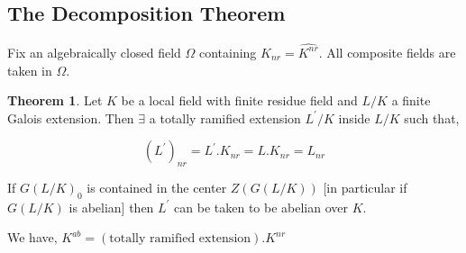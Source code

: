 \documentclass{article}
\theoremstyle{definition}
\newtheorem{theorem}{Theorem}
\numberwithin{theorem}{subsection}
\begin{document}
    \subsection*{The Decomposition Theorem}

    Fix an algebraically closed field \(\Omega\) containing \(K_{nr} = \widehat{K^{nr}}\). All composite fields are taken in \(\Omega\).

    \begin{theorem}
        Let \(K\) be a local field with finite residue field and \(L / K\) a finite Galois extension. Then \(\exists\) a totally ramified extension \(L^{\prime} / K\) inside \(L / K\) such that,

        \[
            (L^{\prime})_{nr} = L^{\prime} . K_{nr} = L . K_{nr} = L_{nr} 
        \]

        If \(G(L / K)_0\) is contained in the center \(Z(G(L / K))\) [in particular if \(G(L / K)\) is abelian] then \(L^{\prime}\) can be taken to be abelian over \(K\).
    \end{theorem}

    We have, \(K^{ab} = (\text{totally ramified extension}) . K^{nr}\)
\end{document}

